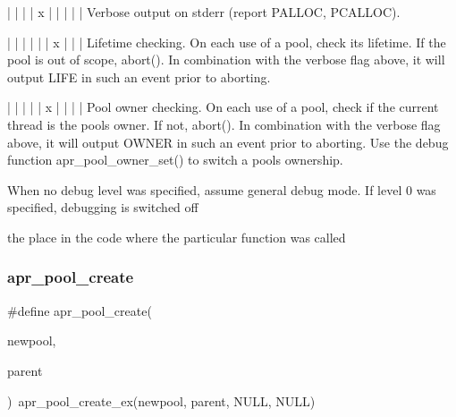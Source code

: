 \begin{DoxyPre}|   |   |   | x |   |   |   |   |  Verbose output on stderr (report
                                   PALLOC, PCALLOC).\end{DoxyPre}



\begin{DoxyPre}|   |   |   |   |   | x |   |   |  Lifetime checking. On each use of a
                                   pool, check its lifetime.  If the pool
                                   is out of scope, abort().
                                   In combination with the verbose flag
                                   above, it will output LIFE in such an
                                   event prior to aborting.\end{DoxyPre}



\begin{DoxyPre}|   |   |   |   | x |   |   |   |  Pool owner checking.  On each use of a
                                   pool, check if the current thread is the
                                   pools owner.  If not, abort().  In
                                   combination with the verbose flag above,
                                   it will output OWNER in such an event
                                   prior to aborting.  Use the debug
                                   function apr\_pool\_owner\_set() to switch
                                   a pools ownership.\end{DoxyPre}



\begin{DoxyPre}When no debug level was specified, assume general debug mode.
If level 0 was specified, debugging is switched off
\end{DoxyPre}
the place in the code where the particular function was called \mbox{\label{group__apr__pools_gaa7c40921aae156b665e82b0a66991a39}} 
\subsubsection{\texorpdfstring{apr\+\_\+pool\+\_\+create}{apr\_pool\_create}}
{\footnotesize\ttfamily \#define apr\+\_\+pool\+\_\+create(\begin{DoxyParamCaption}\item[{}]{newpool,  }\item[{}]{parent }\end{DoxyParamCaption})~apr\+\_\+pool\+\_\+create\+\_\+ex(newpool, parent, N\+U\+LL, N\+U\+LL)}

